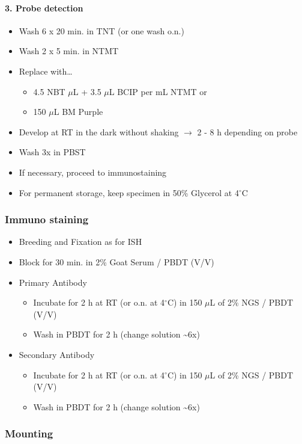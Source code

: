 \documentclass[11pt,singlespacinge,twoside]{reedthesis} %
\providecommand{\tightlist}{%
  \setlength{\itemsep}{0pt}\setlength{\parskip}{0pt}}
\begin{document}
\hypertarget{probe-detection}{%
\paragraph{3. Probe detection}\label{probe-detection}}
\begin{itemize}
\tightlist
\item
  Wash 6 x 20 min. in TNT (or one wash o.n.)
\item
  Wash 2 x 5 min. in NTMT
\item
  Replace with\ldots{}
  \begin{itemize}
  \tightlist
  \item
    4.5 NBT \(\mu\)L + 3.5 \(\mu\)L BCIP per mL NTMT or
  \item
    150 \(\mu\)L BM Purple
  \end{itemize}
\item
  Develop at RT in the dark without shaking \newline \(\rightarrow\) 2 - 8 h depending on probe
\item
  Wash 3x in PBST
\item
  If necessary, proceed to immunostaining
\item
  For permanent storage, keep specimen in 50\% Glycerol at 4\(^\circ\)C
\end{itemize}
\hypertarget{immuno-met}{%
\subsubsection{Immuno staining}\label{immuno-met}}
\begin{itemize}
\tightlist
\item
  Breeding and Fixation as for ISH
\item
  Block for 30 min. in 2\% Goat Serum / PBDT (V/V)
\item
  Primary Antibody
  \begin{itemize}
  \tightlist
  \item
    Incubate for 2 h at RT (or o.n. at 4\(^\circ\)C) in 150 \(\mu\)L of 2\% NGS / PBDT (V/V)
  \item
    Wash in PBDT for 2 h (change solution \textasciitilde{}6x)
  \end{itemize}
\item
  Secondary Antibody
  \begin{itemize}
  \tightlist
  \item
    Incubate for 2 h at RT (or o.n. at 4\(^\circ\)C) in 150 \(\mu\)L of 2\% NGS / PBDT (V/V)
  \item
    Wash in PBDT for 2 h (change solution \textasciitilde{}6x)
  \end{itemize}
\end{itemize}
\hypertarget{mount-met}{%
\subsubsection{Mounting}\label{mount-met}}
\end{document}
